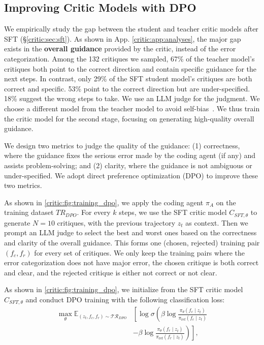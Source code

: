 \subsection{Improving Critic Models with DPO}
\label{critic:sec:dpo}
We empirically study the gap between the student and teacher critic models after SFT (\S\ref{critic:sec:sft}).
As shown in App. \ref{critic:app:analyses}, the major gap exists in the \textbf{overall guidance} provided by the critic, instead of the error categorization.
Among the 132 critiques we sampled, 67\% of the teacher model's critiques both point to the correct direction and contain specific guidance for the next steps.
In contrast, only 29\% of the SFT student model's critiques are both correct and specific. 53\% point to the correct direction but are under-specified. 18\% suggest the wrong steps to take.
We use an LLM judge for the judgment. We choose a different model from the teacher model to avoid self-bias~\cite{llmjudge}.
We thus train the critic model for the second stage, focusing on generating high-quality overall guidance.

We design two metrics to judge the quality of the guidance: (1) correctness, where the guidance fixes the serious error made by the coding agent (if any) and assists problem-solving; and (2) clarity, where the guidance is not ambiguous or under-specified.
We adopt direct preference optimization (DPO) to improve these two metrics.

As shown in \autoref{critic:fig:training_dpo}, we apply the coding agent $\pi_A$ on the training dataset $TR_{DPO}$. For every $k$ steps, we use the SFT critic model $C_{SFT,\theta}$ to generate $N=10$ critiques, with the previous trajectory $z_t$ as context. Then we prompt an LLM judge to select the best and worst ones based on the correctness and clarity of the overall guidance.
This forms one (chosen, rejected) training pair $(f_c, f_r)$ for every set of critiques. We only keep the training pairs where the error categorization does not have major error, the chosen critique is both correct and clear, and the rejected critique is either not correct or not clear.

As shown in \autoref{critic:fig:training_dpo}, we initialize from the SFT critic model $C_{SFT,\theta}$ and conduct DPO training with the following classification loss:
\begin{equation}
\begin{aligned}
    \max _{\mathcal{\theta}} 
    \mathbb{E}_{\left(z_t, f_c, f_r\right) \sim \mathcal{TR}_{DPO}}
    & \left[\right.
    \log \sigma
    \left(\right. \beta 
    \log \frac{\pi_\mathcal{\theta}\left(f_c \mid z_t\right)}{\pi_{\text {ref}}\left(f_c \mid z_t\right)} \\
    & -\beta 
    \log \frac{\pi_\mathcal{\theta}\left(f_r \mid z_t\right)}{\pi_{\text {ref}}\left(f_r \mid z_t\right)}
    \left.\right)
    \left.\right],
\end{aligned}
\end{equation}

